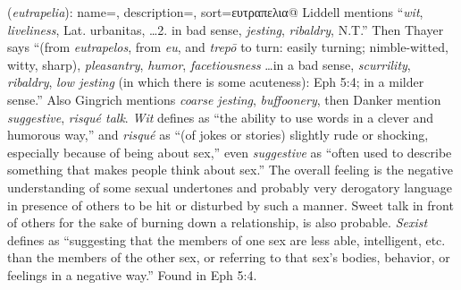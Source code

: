\item[Sexist speech,]

(\textit{eutrapelia}):
{
    name=,
    description={},
    sort=ευτραπελια@
}
Liddell mentions ``\emph{wit}, \emph{liveliness}, Lat. urbanitas, \ldots 2. in bad sense, \emph{jesting}, \emph{ribaldry}, N.T.'' Then Thayer says ``(from \emph{eutrapelos}, from \emph{eu}, and \emph{trepō} to turn: easily turning; nimble-witted, witty, sharp), \emph{pleasantry}, \emph{humor}, \emph{facetiousness} \ldots in a bad sense, \emph{scurrility}, \emph{ribaldry}, \emph{low jesting} (in which there is some acuteness): Eph 5:4; in a milder sense.'' Also Gingrich mentions \emph{coarse jesting}, \emph{buffoonery}, then Danker mention \emph{suggestive}, \emph{risqué talk}. \emph{Wit} defines as ``the ability to use words in a clever and humorous way,'' and \emph{risqué} as ``(of jokes or stories) slightly rude or shocking, especially because of being about sex,'' even \emph{suggestive} as ``often used to describe something that makes people think about sex.'' The overall feeling is the negative understanding of some sexual undertones and probably very derogatory language in presence of others to be hit or disturbed by such a manner. Sweet talk in front of others for the sake of burning down a relationship, is also probable. \emph{Sexist} defines as ``suggesting that the members of one sex are less able, intelligent, etc. than the members of the other sex, or referring to that sex's bodies, behavior, or feelings in a negative way.''
Found in Eph 5:4.
